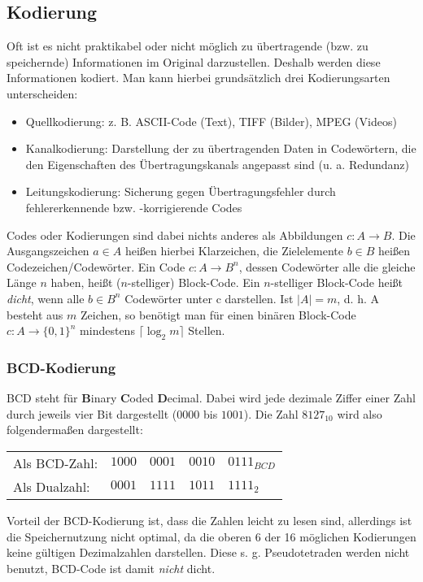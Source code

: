 \documentclass[11pt]{article}
\begin{document}
\subsection{Kodierung}
Oft ist es nicht praktikabel oder nicht möglich zu übertragende (bzw. zu speichernde) Informationen im Original darzustellen. Deshalb werden diese Informationen kodiert. Man kann hierbei grundsätzlich drei Kodierungsarten unterscheiden:
\begin{itemize}
\item Quellkodierung: z. B. ASCII-Code (Text), TIFF (Bilder), MPEG (Videos)
\item Kanalkodierung: Darstellung der zu übertragenden Daten in Codewörtern, die den Eigenschaften des Übertragungskanals angepasst sind (u. a. Redundanz)
\item Leitungskodierung: Sicherung gegen Übertragungsfehler durch fehlererkennende bzw. -korrigierende Codes
\end{itemize}
Codes oder Kodierungen sind dabei nichts anderes als Abbildungen \(c:A \rightarrow B\). Die Ausgangszeichen \(a \in A\) heißen hierbei Klarzeichen, die Zielelemente \( b \in B \) heißen Codezeichen/Codewörter. Ein Code \(c:A \rightarrow B^n \), dessen Codewörter alle die gleiche Länge \(n\) haben, heißt (\(n\)-stelliger) Block-Code. Ein \(n\)-stelliger Block-Code heißt \textit{dicht}, wenn alle \(b \in B^n\) Codewörter unter c darstellen. Ist \(|A|=m\), d. h. A besteht aus \(m\) Zeichen, so benötigt man für einen binären Block-Code \(c:A \rightarrow \{0,1\}^n\) mindestens \(\lceil \log_2{m} \rceil\) Stellen.
\subsubsection{BCD-Kodierung}
BCD steht für \textbf{B}inary \textbf{C}oded \textbf{D}ecimal. Dabei wird jede dezimale Ziffer einer Zahl durch jeweils vier Bit dargestellt (\(0000\) bis \(1001\)). Die Zahl \(8127_{10}\) wird also folgendermaßen dargestellt:\\
\begin{center}
  \begin{tabular}{ll}
  Als BCD-Zahl:& \(1000 \quad 0001 \quad 0010 \quad 0111_{BCD}\) \\
  Als Dualzahl:& \(0001 \quad 1111 \quad 1011 \quad 1111_2 \)
\end{tabular}
\end{center}
Vorteil der BCD-Kodierung ist, dass die Zahlen leicht zu lesen sind, allerdings ist die Speichernutzung nicht optimal, da die oberen 6 der 16 möglichen Kodierungen keine gültigen Dezimalzahlen darstellen. Diese s. g. Pseudotetraden werden nicht benutzt, BCD-Code ist damit \emph{nicht} dicht.
\end{document}
